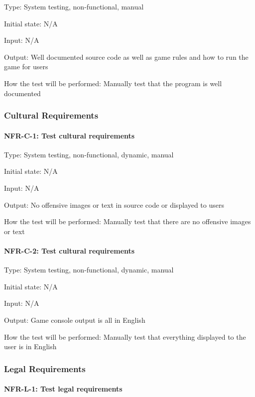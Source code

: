 \documentclass[12pt, titlepage]{article}
\begin{document}
Type: System testing, non-functional, manual

Initial state: N/A

Input: N/A

Output: Well documented source code as well as game rules and how to run the game for users

How the test will be performed: Manually test that the program is well documented

\subsubsection{Cultural Requirements}

\paragraph{NFR-C-1: Test cultural requirements\\}

Type: System testing, non-functional, dynamic, manual

Initial state: N/A

Input: N/A

Output: No offensive images or text in source code or displayed to users

How the test will be performed: Manually test that there are no offensive images or text

\paragraph{NFR-C-2: Test cultural requirements\\}

Type: System testing, non-functional, dynamic, manual

Initial state: N/A

Input: N/A

Output: Game console output is all in English

How the test will be performed: Manually test that everything displayed to the user is in English

\subsubsection{Legal Requirements}

\paragraph{NFR-L-1: Test legal requirements\\}
\end{document}

